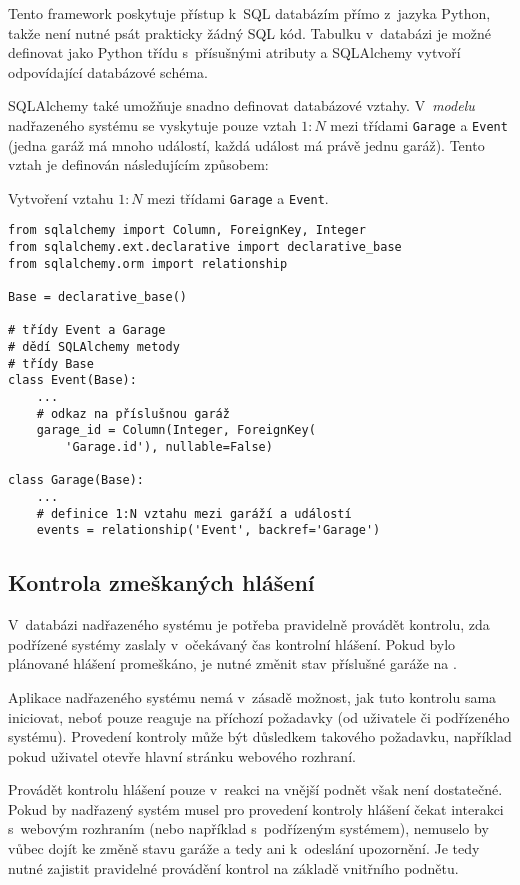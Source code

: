 Tento framework poskytuje přístup k~SQL databázím přímo z~jazyka Python, takže není nutné psát prakticky žádný SQL kód. Tabulku v~databázi je možné definovat jako Python třídu s~přísušnými atributy a SQLAlchemy vytvoří odpovídající databázové schéma. 

SQLAlchemy také umožňuje snadno definovat databázové vztahy. V~\textit{modelu} nadřazeného systému se vyskytuje pouze vztah $1:N$ mezi třídami \texttt{Garage} a \texttt{Event} (jedna garáž má mnoho událostí, každá událost má právě jednu garáž). Tento vztah je definován následujícím způsobem:

\begin{listing}[htbp]
\caption{\label{lst:db_relationship} Vytvoření vztahu $1:N$ mezi třídami \texttt{Garage} a \texttt{Event}.}
\begin{verbatim}
from sqlalchemy import Column, ForeignKey, Integer
from sqlalchemy.ext.declarative import declarative_base
from sqlalchemy.orm import relationship

Base = declarative_base()

# třídy Event a Garage
# dědí SQLAlchemy metody
# třídy Base
class Event(Base):
    ...
    # odkaz na příslušnou garáž
    garage_id = Column(Integer, ForeignKey(
        'Garage.id'), nullable=False)

class Garage(Base): 
    ...
    # definice 1:N vztahu mezi garáží a událostí
    events = relationship('Event', backref='Garage')
\end{verbatim}
\end{listing}

\subsection{Kontrola zmeškaných hlášení}
\label{sec:im_scheduler}

V~databázi nadřazeného systému je potřeba pravidelně provádět kontrolu, zda podřízené systémy zaslaly v~očekávaný čas kontrolní hlášení. Pokud bylo plánované hlášení promeškáno, je nutné změnit stav příslušné garáže na .

Aplikace nadřazeného systému nemá v~zásadě možnost, jak tuto kontrolu sama iniciovat, neboť pouze reaguje na příchozí požadavky (od uživatele či podřízeného systému). Provedení kontroly může být důsledkem takového požadavku, například pokud uživatel otevře hlavní stránku webového rozhraní. 

Provádět kontrolu hlášení pouze v~reakci na vnější podnět však není dostatečné. Pokud by nadřazený systém musel pro provedení kontroly hlášení čekat interakci s~webovým rozhraním (nebo například s~podřízeným systémem), nemuselo by vůbec dojít ke změně stavu garáže a tedy ani k~odeslání upozornění. Je tedy nutné zajistit pravidelné provádění kontrol na základě vnitřního podnětu.

